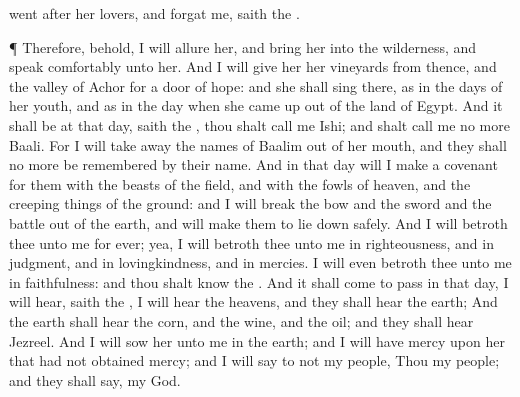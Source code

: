 {went
after her
lovers, and
forgat me,
saith the
{}.
\par }{\PP {}¶ Therefore, behold, I will
allure her, and
bring her into the
wilderness, and
speak
comfortably unto her.
And I will
give her her
vineyards from thence, and the
valley of
Achor for a
door of
hope: and she shall
sing there, as in the
days of her
youth, and as in the
day when she came
up out of the
land of
Egypt.
And it shall be at that
day,
saith the
{},
{} thou shalt
call me
Ishi; and shalt
call me no more
Baali.
For I will take
away the
names of
Baalim out of her
mouth, and they shall no more be
remembered by their
name.
And in that
day will I
make a
covenant for them with the
beasts of the
field, and with the
fowls of
heaven, and
{} the creeping
things of the
ground: and I will
break the
bow and the
sword and the
battle out of the
earth, and will make them to lie
down
safely.
And I will
betroth thee unto me for
ever; yea, I will
betroth thee unto me in
righteousness, and in
judgment, and in
lovingkindness, and in
mercies.
I will even
betroth thee unto me in
faithfulness: and thou shalt
know the
{}.
And it shall come to pass in that
day, I will
hear,
saith the
{}, I will
hear the
heavens, and they shall
hear the
earth;
And the
earth shall
hear the
corn, and the
wine, and the
oil; and they shall
hear
Jezreel.
And I will
sow her unto me in the
earth; and I will have
mercy upon her that had not obtained
mercy; and I will
say to
{} not my
people, Thou
{} my
people; and they shall
say,
{} my
God.

\par }
